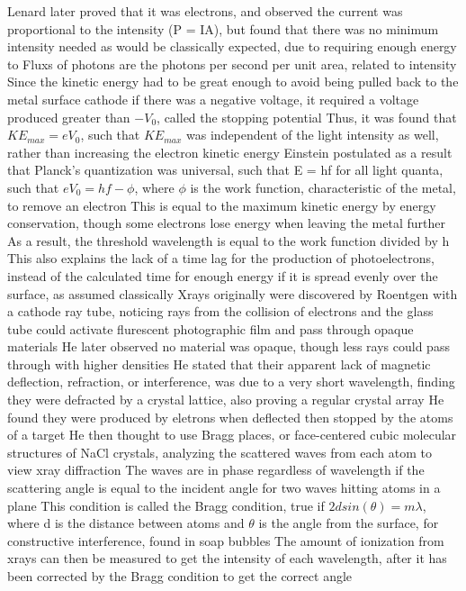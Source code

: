 \documentclass[11 pt, twoside]{article}
\newenvironment{outline*}
{
	\begin{outline}[enumerate]
	}
	{\end{outline}
}
\begin{document}
\begin{outline*}
	\2 Lenard later proved that it was electrons, and observed the current was proportional to the intensity (P = IA), but found that there was no minimum intensity needed as would be classically expected, due to requiring enough energy to
		\3 Fluxs of photons are the photons per second per unit area, related to intensity 
		\3 Since the kinetic energy had to be great enough to avoid being pulled back to the metal surface cathode if there was a negative voltage, it required a voltage produced greater than $-V_0$, called the stopping potential
		\3 Thus, it was found that $KE_{max} = eV_0$, such that $KE_{max}$ was independent of the light intensity as well, rather than increasing the electron kinetic energy
	\2 Einstein postulated as a result that Planck's quantization was universal, such that E = hf for all light quanta, such that $eV_0 = hf - \phi$, where $\phi$ is the work function, characteristic of the metal, to remove an electron
		\3 This is equal to the maximum kinetic energy by energy conservation, though some electrons lose energy when leaving the metal further
		\3 As a result, the threshold wavelength is equal to the work function divided by h
		\3 This also explains the lack of a time lag for the production of photoelectrons, instead of the calculated time for enough energy if it is spread evenly over the surface, as assumed classically
\1 Xrays originally were discovered by Roentgen with a cathode ray tube, noticing rays from the collision of electrons and the glass tube could activate flurescent photographic film and pass through opaque materials
	\2 He later observed no material was opaque, though less rays could pass through with higher densities
	\2 He stated that their apparent lack of magnetic deflection, refraction, or interference, was due to a very short wavelength, finding they were defracted by a crystal lattice, also proving a regular crystal array
	\2 He found they were produced by eletrons when deflected then stopped by the atoms of a target
	\2 He then thought to use Bragg places, or face-centered cubic molecular structures of NaCl crystals, analyzing the scattered waves from each atom to view xray diffraction
		\3 The waves are in phase regardless of wavelength if the scattering angle is equal to the incident angle for two waves hitting atoms in a plane
		\3 This condition is called the Bragg condition, true if $2dsin(\theta) = m\lambda$, where d is the distance between atoms and $\theta$ is the angle from the surface, for constructive interference, found in soap bubbles
		\3 The amount of ionization from xrays can then be measured to get the intensity of each wavelength, after it has been corrected by the Bragg condition to get the correct angle

\end{outline*}
\end{document}
